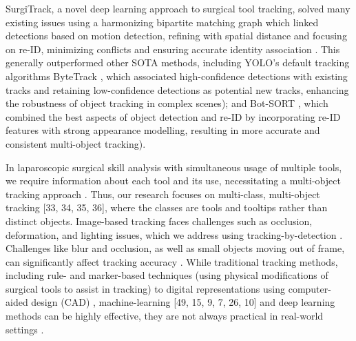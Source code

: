 SurgiTrack, a novel deep learning approach to surgical tool tracking, solved many existing issues using a harmonizing bipartite matching graph which linked detections based on motion detection, refining with spatial distance and focusing on re-ID, minimizing conflicts and ensuring accurate identity association \cite{SurgiTrack}. This generally outperformed other SOTA methods, including YOLO's default tracking algorithms ByteTrack \cite{ByteTrack}, which associated high-confidence detections with existing tracks and retaining low-confidence detections as potential new tracks, enhancing the robustness of object tracking in complex scenes); and Bot-SORT \cite{BoT-SORT}, which combined the best aspects of object detection and re-ID by incorporating re-ID features with strong appearance modelling, resulting in more accurate and consistent multi-object tracking).

In laparoscopic surgical skill analysis with simultaneous usage of multiple tools, we require information about each tool and its use, necessitating a multi-object tracking approach \cite{https://www.tandfonline.com/doi/full/10.1080/24699322.2020.1801842}. Thus, our research focuses on multi-class, multi-object tracking [33, 34, 35, 36], where the classes are tools and tooltips rather than distinct objects. Image-based tracking faces challenges such as occlusion, deformation, and lighting issues, which we address using tracking-by-detection \cite{SurgiTrack}. Challenges like blur and occlusion, as well as small objects moving out of frame, can significantly affect tracking accuracy \cite{https://link.springer.com/chapter/10.1007/978-3-319-46720-7_49, https://link.springer.com/article/10.1007/s11548-024-03246-4}. While traditional tracking methods, including rule- and
marker-based techniques (using physical modifications of surgical tools to assist in tracking) \cite{45, 46, 47, https://ieeexplore.ieee.org/abstract/document/8574022, https://openaccess.thecvf.com/content/CVPR2022/html/Su_ZebraPose_Coarse_To_Fine_Surface_Encoding_for_6DoF_Object_Pose_CVPR_2022_paper.html, https://link.springer.com/article/10.1007/s11548-017-1558-9, https://www.frontiersin.org/articles/10.3389/frobt.2021.751741/full., https://ieeexplore.ieee.org/abstract/document/6359786} to digital representations using computer-aided design (CAD) \cite{https://link.springer.com/chapter/10.1007/978-3-319-46720-7_45}, machine-learning [49, 15, 9, 7, 26, 10] and deep learning methods \cite{28,48,https://link.springer.com/chapter/10.1007/978-3-319-46720-7_45,49,15,9,7,26,10} can be highly effective, they are not always practical in real-world settings \cite{bodenstedt_comparative_2018}.

